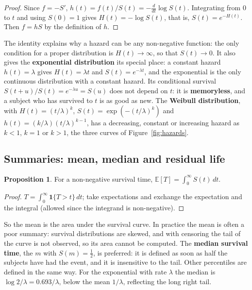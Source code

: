 \documentclass[11pt,a4paper]{article}
\numberwithin{equation}{section}
\theoremstyle{definition}
\newtheorem{prop}[thm]{Proposition}
\begin{document}
\begin{proof}
Since $f = -S'$, $h(t) = f(t)/S(t) = -\frac{d}{dt}\log S(t)$. Integrating from $0$ to $t$ and using $S(0) = 1$ gives $H(t) = -\log S(t)$, that is, $S(t) = e^{-H(t)}$. Then $f = hS$ by the definition of $h$.
\end{proof}

The identity explains why a hazard can be any non-negative function: the only condition for a proper distribution is $H(t) \to \infty$, so that $S(t) \to 0$. It also gives the \textbf{exponential distribution} its special place: a constant hazard $h(t) = \lambda$ gives $H(t) = \lambda t$ and $S(t) = e^{-\lambda t}$, and the exponential is the only
continuous distribution with a constant hazard. Its conditional survival $S(t + u)/S(t) = e^{-\lambda u} = S(u)$ does not depend on $t$: it is \textbf{memoryless}, and a subject who has survived to $t$ is as good as new. The \textbf{Weibull distribution}, with $H(t) = (t/\lambda)^k$, $S(t) = \exp(-(t/\lambda)^k)$ and
$h(t) = (k/\lambda)(t/\lambda)^{k - 1}$, has a decreasing, constant or increasing hazard as $k < 1$, $k = 1$ or $k > 1$, the three curves of Figure~\ref{fig:hazards}.

\subsection{Summaries: mean, median and residual life}
\label{ssec:summaries}

\begin{prop}
\label{prop:meanS}
For a non-negative survival time, $\mathbb E[T] = \int_0^\infty S(t)\,dt$.
\end{prop}

\begin{proof}
$T = \int_0^\infty\mathbf 1\{T > t\}\,dt$; take expectations and exchange the expectation and the integral (allowed since the integrand is non-negative).
\end{proof}

So the mean is the area under the survival curve. In practice the mean is often a poor summary: survival distributions are skewed, and with censoring the tail of the curve is not observed, so its area cannot be computed. The \textbf{median survival time}, the $m$ with $S(m) = \frac12$, is preferred: it is defined as soon as half the subjects have had the
event, and it is insensitive to the tail. Other percentiles are defined in the same way. For the exponential with rate $\lambda$ the median is $\log 2/\lambda = 0.693/\lambda$, below the mean $1/\lambda$, reflecting the long right tail.
\end{document}
